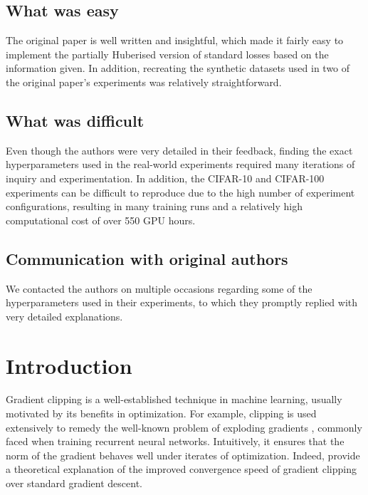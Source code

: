 \subsection*{What was easy}

The original paper is well written and insightful, which made it fairly easy to implement the partially Huberised version of standard losses based on the information given. In addition, recreating the synthetic datasets used in two of the original paper's experiments was relatively straightforward.

\subsection*{What was difficult}

Even though the authors were very detailed in their feedback, finding the exact hyperparameters used in the real-world experiments required many iterations of inquiry and experimentation. In addition, the CIFAR-10 and CIFAR-100 experiments can be difficult to reproduce due to the high number of experiment configurations, resulting in many training runs and a relatively high computational cost of over 550 GPU hours.

\subsection*{Communication with original authors}

We contacted the authors on multiple occasions regarding some of the hyperparameters used in their experiments, to which they promptly replied with very detailed explanations.

\newpage


\section{Introduction}


Gradient clipping is a well-established technique in machine learning, usually motivated by its benefits in optimization. For example, clipping is used extensively to remedy the well-known problem of exploding gradients \citep{bengio1994learning}, commonly faced when training recurrent neural networks. Intuitively, it ensures that the norm of the gradient behaves well under iterates of optimization. Indeed, \citet{zhang2019analysis} provide a theoretical explanation of the improved convergence speed of gradient clipping over standard gradient descent.

